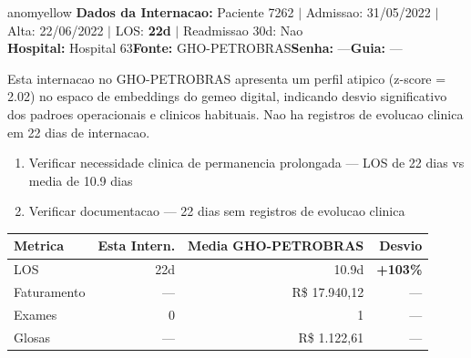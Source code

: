 \documentclass[a4paper,10pt]{article}
\begin{document}
\begin{anomalycard}[Internacao 7186 | GHO-PETROBRAS | MODERADO (z=2.02)]{anomyellow}
\textbf{Dados da Internacao:} Paciente 7262 $\mid$ Admissao: 31/05/2022 $\mid$ Alta: 22/06/2022 $\mid$ LOS: \textbf{22d} $\mid$ Readmissao 30d: Nao\\
\textbf{Hospital:} Hospital 63\quad\textbf{Fonte:} GHO-PETROBRAS\quad\textbf{Senha:} ---\quad\textbf{Guia:} ---\\
\vspace{2pt}\begin{tcolorbox}[colback=severityred!20,colframe=anomyellow,title={\textbf{Interpretacao de Negocio}},fonttitle=\bfseries\small,left=4pt,right=4pt,top=3pt,bottom=3pt]
{\small Esta internacao no GHO-PETROBRAS apresenta um perfil atipico (z-score = 2.02) no espaco de embeddings do gemeo digital, indicando desvio significativo dos padroes operacionais e clinicos habituais. Nao ha registros de evolucao clinica em 22 dias de internacao.}
\end{tcolorbox}
\begin{tcolorbox}[colback=severityyellow!30,colframe=anomorange,title={\textbf{Recomendacoes Especificas}},fonttitle=\bfseries\small,left=4pt,right=4pt,top=3pt,bottom=3pt]
\begin{enumerate}[nosep,leftmargin=16pt]
\item {\small Verificar necessidade clinica de permanencia prolongada --- LOS de 22 dias vs media de 10.9 dias}
\item {\small Verificar documentacao --- 22 dias sem registros de evolucao clinica}
\end{enumerate}
\end{tcolorbox}
\begin{center}\begin{tabular}{l r r r}\toprule\textbf{Metrica} & \textbf{Esta Intern.} & \textbf{Media GHO-PETROBRAS} & \textbf{Desvio} \\\midrule
LOS & 22d & 10.9d & \textcolor{anomred}{\textbf{+103\%}} \\
Faturamento & --- & R\$ 17.940,12 & --- \\
Exames & 0 & 1 & --- \\
Glosas & --- & R\$ 1.122,61 & --- \\
\bottomrule\end{tabular}\end{center}


\end{anomalycard}
\end{document}
